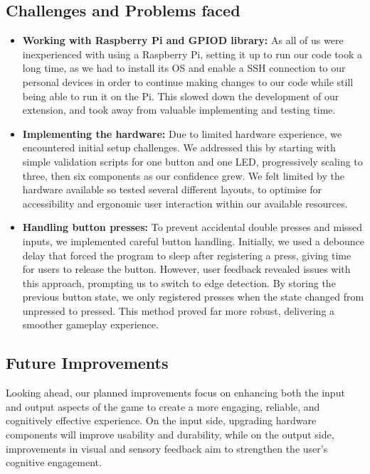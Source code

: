 \documentclass[11pt]{article}
\begin{document}
\subsection{Challenges and Problems faced}
 \begin{itemize}
     \item \textbf{Working with Raspberry Pi and GPIOD library:} As all of us were inexperienced with using a Raspberry Pi, setting it up to run our code took a long time, as we had to install its OS and enable a SSH connection to our personal devices in order to continue making changes to our code while still being able to run it on the Pi. This slowed down the development of our extension, and took away from valuable implementing and testing time.
     \item \textbf{Implementing the hardware:} Due to limited hardware experience, we encountered initial setup challenges. We addressed this by starting with simple validation scripts for one button and one LED, progressively scaling to three, then six components as our confidence grew. We felt limited by the hardware available so tested several different layouts, to optimise for accessibility and ergonomic user interaction within our available resources.
     \item \textbf{Handling button presses: }To prevent accidental double presses and missed inputs, we implemented careful button handling. Initially, we used a debounce delay that forced the program to sleep after registering a press, giving time for users to release the button. However, user feedback revealed issues with this approach, prompting us to switch to edge detection. By storing the previous button state, we only registered presses when the state changed from unpressed to pressed. This method proved far more robust, delivering a smoother gameplay experience.
 \end{itemize}

\subsection{Future Improvements}
Looking ahead, our planned improvements focus on enhancing both the input and output aspects of the game to create a more engaging, reliable, and cognitively effective experience. On the input side, upgrading hardware components will improve usability and durability, while on the output side, improvements in visual and sensory feedback aim to strengthen the user’s cognitive engagement.
\end{document}
